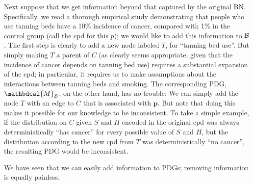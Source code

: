 \documentclass[letterpaper]{article} %
\theoremstyle{plain}
\theoremstyle{definition}
\theoremstyle{remark}
\newcommand\mat[1]{\mathbf{#1}}
\newcommand{\dg}[1]{\mathbdcal{#1}}
\newcommand{\PDGof}[1]{{\dg M}_{#1}}
\begin{document}
\begin{example}[emulating a BN]
Next suppose that we get information beyond that captured by the original BN.
Specifically, we read a thorough empirical study demonstrating that people who
use tanning beds have a 10\% incidence of cancer, compared with 1\% in the
control group 
(call the cpd for this $p$); we would like to add this information to
$\cal B$. The first step is clearly to add a new node labeled $T$, for ``tanning
bed use''.  But simply making $T$ a parent of $C$ (as clearly seems appropriate,
given that the incidence of cancer depends on tanning bed use) requires a
substantial expansion of the cpd; in particular, it requires us to make
assumptions about the interactions between tanning beds and smoking.  
%
The corresponding PDG, $\PDGof{{\mathcal B}}$, on the other hand, has no
trouble: We can simply add the node $T$ with an edge to $C$ that is associated
with $\mat p$.  But note that doing this makes it possible for our knowledge to
be inconsistent. To take a simple example, if the distribution on $C$ given $S$
and $H$ encoded in the original cpd was always deterministically ``has cancer''
for every possible value of $S$ and $H$, but the distribution according to the
new cpd from $T$ was deterministically ``no cancer'', the resulting PDG would be
inconsistent.  
%
\end{example}


We have seen that we can easily add information to PDGs; removing information is
equally painless.   
\end{document}
